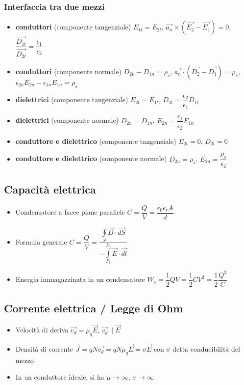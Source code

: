 \documentclass{article}
\begin{document}
\subsubsection{Interfaccia tra due mezzi}
\begin{itemize}
	\item \textbf{conduttori} (componente tangenziale) \(E_{1t} = E_{2t}\), \(\vec{a_n} \times (\vec{E_2} - \vec{E_1}) = 0 \), \( \dfrac{\vec{D_{1t}}}{\vec{D_{2t}}} = \dfrac{\epsilon_1}{\epsilon_2} \)
	\item \textbf{conduttori} (componente normale) \( D_{2n} - D_{1n} = \rho_s \), \(\vec{a_n} \cdot (\vec{D_2} - \vec{D_1}) = \rho_s \), \(\epsilon_{2n} E_{2n} - \epsilon_{1n} E_{1n} = \rho_s \)
	\item \textbf{dielettrici} (componente tangenziale) \( E_{2t} = E_{1t} \), \( D_{2t} = \dfrac{\epsilon_2}{\epsilon_1} D_{1t} \)
	\item \textbf{dielettrici} (componente normale) \( D_{2n} = D_{1n} \), \( E_{2n} = \dfrac{\epsilon_1}{\epsilon_2} E_{1n} \)
	\item \textbf{conduttore e dielettrico} (componente tangenziale) \( E_{2t} = 0\), \(D_{2t} = 0\)
	\item \textbf{conduttore e dielettrico} (componente normale) \( D_{2n} = \rho_s \), \( E_{2n} = \dfrac{\rho_s}{\epsilon_2} \)
\end{itemize}

\subsection{Capacità elettrica}
\begin{itemize}
	\item Condensatore a facce piane parallele \( C = \dfrac{Q}{V} = \dfrac{\epsilon_0 \epsilon_r A}{d} \)
	\item Formula generale \(\displaystyle C = \dfrac{Q}{V} = \dfrac{\oint\limits_{S}\vec{D} \cdot \vec{dS}}{-\int\limits_{P_1}^{P_2} \vec{E} \cdot \vec{dl}} \)
	\item Energia immagazzinata in un condensatore \(W_e = \dfrac{1}{2} Q V = \dfrac{1}{2} C V^2 = \dfrac{1}{2} \dfrac{Q^2}{C} \)
\end{itemize}

\subsection{Corrente elettrica / Legge di Ohm}
\begin{itemize}
	\item Velocità di deriva \(\vec{v_d} = \mu_q \vec{E} \), \( \vec{v_d} \| \vec{E} \)
	\item Densità di corrente \( \vec{J} = qN \vec{v_d} = qN \mu_q \vec{E} = \sigma \vec{E} \) con \(\sigma\) detta conducibilità del mezzo
	\item In un conduttore ideale, si ha \(\mu \rightarrow \infty\), \(\sigma \rightarrow \infty \)
\end{itemize}
\end{document}
